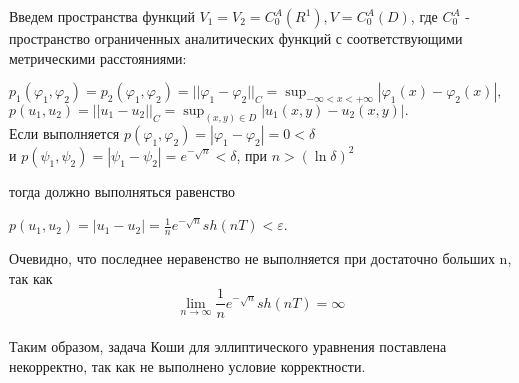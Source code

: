 \documentclass[../main.tex]{subfiles}
\begin{document}
Введем пространства функций $V_1=V_2=C_0^A(R^1), V=C_0^A(D)$, где $C_0^A$ - пространство ограниченных аналитических функций с соответствующими метрическими расстояниями:
\begin{center}
	$p_1(\varphi_1,\varphi_2)=p_2(\varphi_1, \varphi_2) =||\varphi_1-\varphi_2||_C = \sup_{-\infty<x<+\infty}|\varphi_1(x)-\varphi_2(x)|, $\\
	$ $\\
	$p(u_1, u_2)=||u_1-u_2||_C=\sup_{(x,y) \in D}|u_1(x,y)-u_2(x,y)|.$\\
	$ $\\
	Если выполняется $p(\varphi_1,\varphi_2)=|\varphi_1-\varphi_2|=0<\delta$\\
	$ $\\
	и $p(\psi_1,\psi_2)=|\psi_1-\psi_2|=e^{-\sqrt{n}}<\delta$, при $n>(\ln{\delta})^2$
\end{center}

тогда должно выполняться равенство

\begin{center}
	$p(u_1,u_2)=|u_1-u_2|=\frac{1}{n}e^{-\sqrt{n}}sh(nT)<\varepsilon$.
\end{center}

Очевидно, что последнее неравенство не выполняется при достаточно больших n, так как \[\lim_{n \to \infty}{\frac{1}{n}}e^{-\sqrt{n}}sh(nT)=\infty\]\\

Таким образом, задача Коши для эллиптического уравнения поставлена некорректно, так как не выполнено условие корректности.
\end{document}
